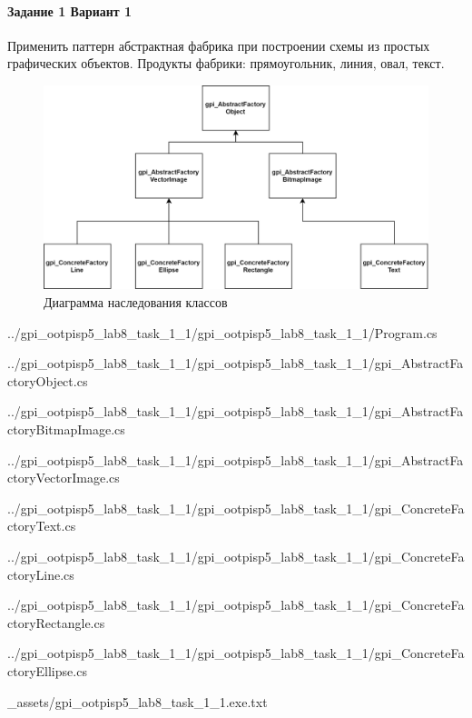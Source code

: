 \paragraph{Задание 1 Вариант 1} \hspace{0pt}

Применить паттерн абстрактная фабрика при построении схемы из простых графических объектов.
Продукты фабрики: прямоугольник, линия, овал, текст.

\begin{figure}[!htb]
    \centering
    \includegraphics[width=16cm]
        {_assets/gpi_ootpisp5_lab8_task_1_1.png}
    \caption{Диаграмма наследования классов}
\end{figure}


{../gpi_ootpisp5_lab8_task_1_1/gpi_ootpisp5_lab8_task_1_1/Program.cs}


{../gpi_ootpisp5_lab8_task_1_1/gpi_ootpisp5_lab8_task_1_1/gpi_AbstractFactoryObject.cs}


{../gpi_ootpisp5_lab8_task_1_1/gpi_ootpisp5_lab8_task_1_1/gpi_AbstractFactoryBitmapImage.cs}


{../gpi_ootpisp5_lab8_task_1_1/gpi_ootpisp5_lab8_task_1_1/gpi_AbstractFactoryVectorImage.cs}


{../gpi_ootpisp5_lab8_task_1_1/gpi_ootpisp5_lab8_task_1_1/gpi_ConcreteFactoryText.cs}


{../gpi_ootpisp5_lab8_task_1_1/gpi_ootpisp5_lab8_task_1_1/gpi_ConcreteFactoryLine.cs}


{../gpi_ootpisp5_lab8_task_1_1/gpi_ootpisp5_lab8_task_1_1/gpi_ConcreteFactoryRectangle.cs}


{../gpi_ootpisp5_lab8_task_1_1/gpi_ootpisp5_lab8_task_1_1/gpi_ConcreteFactoryEllipse.cs}


{_assets/gpi_ootpisp5_lab8_task_1_1.exe.txt}
